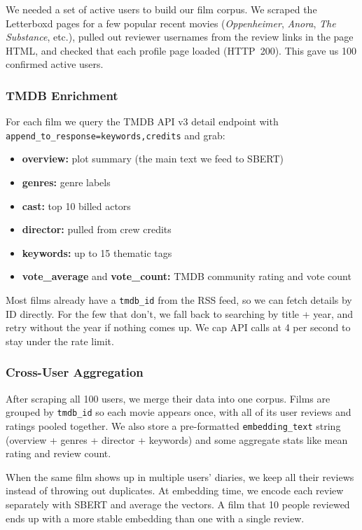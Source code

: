 \documentclass[sigconf,nonacm]{acmart}
\begin{document}
We needed a set of active users to build our film corpus. We scraped the Letterboxd pages for a few popular recent movies (\textit{Oppenheimer}, \textit{Anora}, \textit{The Substance}, etc.), pulled out reviewer usernames from the review links in the page HTML, and checked that each profile page loaded (HTTP~200). This gave us 100 confirmed active users.

\subsubsection{TMDB Enrichment}

For each film we query the TMDB API v3 detail endpoint with \texttt{append\_to\_response=keywords,credits} and grab:

\begin{itemize}
  \item \textbf{overview:} plot summary (the main text we feed to SBERT)
  \item \textbf{genres:} genre labels
  \item \textbf{cast:} top 10 billed actors
  \item \textbf{director:} pulled from crew credits
  \item \textbf{keywords:} up to 15 thematic tags
  \item \textbf{vote\_average} and \textbf{vote\_count:} TMDB community rating and vote count
\end{itemize}

Most films already have a \texttt{tmdb\_id} from the RSS feed, so we can fetch details by ID directly. For the few that don't, we fall back to searching by title + year, and retry without the year if nothing comes up. We cap API calls at 4 per second to stay under the rate limit.

\subsubsection{Cross-User Aggregation}

After scraping all 100 users, we merge their data into one corpus. Films are grouped by \texttt{tmdb\_id} so each movie appears once, with all of its user reviews and ratings pooled together. We also store a pre-formatted \texttt{embedding\_text} string (overview + genres + director + keywords) and some aggregate stats like mean rating and review count.

When the same film shows up in multiple users' diaries, we keep all their reviews instead of throwing out duplicates. At embedding time, we encode each review separately with SBERT and average the vectors. A film that 10 people reviewed ends up with a more stable embedding than one with a single review.
\end{document}
